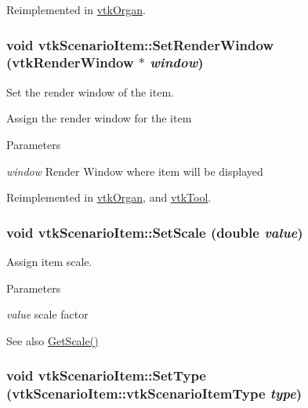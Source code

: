 Reimplemented in \hyperlink{classvtkOrgan_a55ca17e15fea6a6c1672f8b271546e6b}{vtkOrgan}.

\hypertarget{classvtkScenarioItem_a3ce404404d36c342b947f29fa02b6170}{
\subsubsection[{SetRenderWindow}]{\setlength{\rightskip}{0pt plus 5cm}void vtkScenarioItem::SetRenderWindow (vtkRenderWindow $\ast$ {\em window})}}
\label{classvtkScenarioItem_a3ce404404d36c342b947f29fa02b6170}


Set the render window of the item. 

Assign the render window for the item 
\begin{DoxyParams}{Parameters}
\item[{\em window}]Render Window where item will be displayed \end{DoxyParams}


Reimplemented in \hyperlink{classvtkOrgan_a2b6a862da0f1ca6cd192138cdd00b04b}{vtkOrgan}, and \hyperlink{classvtkTool_a8f036524a724871dd5f7317e3000611c}{vtkTool}.

\hypertarget{classvtkScenarioItem_a4d199d1138fbfe835c36cd20efbedb1e}{
\subsubsection[{SetScale}]{\setlength{\rightskip}{0pt plus 5cm}void vtkScenarioItem::SetScale (double {\em value})}}
\label{classvtkScenarioItem_a4d199d1138fbfe835c36cd20efbedb1e}


Assign item scale. 


\begin{DoxyParams}{Parameters}
\item[{\em value}]scale factor \end{DoxyParams}
\begin{DoxySeeAlso}{See also}
\hyperlink{classvtkScenarioItem_a136a346d222abe59fd63b2f4ced9b3fa}{GetScale()} 
\end{DoxySeeAlso}
\hypertarget{classvtkScenarioItem_a9bf24104bbf25c469fa151816afdcb52}{
\subsubsection[{SetType}]{\setlength{\rightskip}{0pt plus 5cm}void vtkScenarioItem::SetType ({\bf vtkScenarioItem::vtkScenarioItemType} {\em type})}}
\label{classvtkScenarioItem_a9bf24104bbf25c469fa151816afdcb52}


